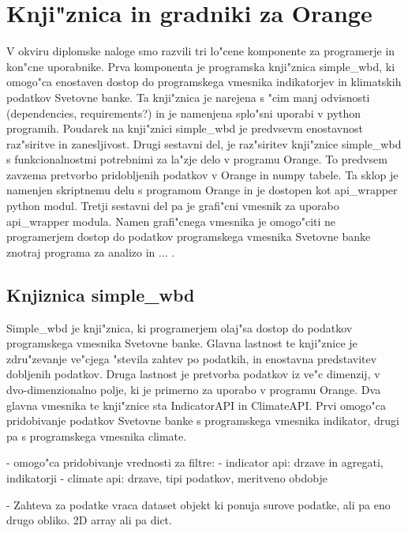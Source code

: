 \chapter{Knji"znica in gradniki za Orange}

V okviru diplomske naloge smo razvili tri lo"cene komponente za programerje in
kon"cne uporabnike. Prva komponenta je programska knji"znica simple\_wbd, ki
omogo"ca enostaven dostop do programskega vmesnika indikatorjev in klimatskih
podatkov Svetovne banke. Ta knji"znica je narejena s "cim manj odvisnosti
(dependencies, requirements?) in je namenjena splo"sni uporabi v python
programih. Poudarek na knji"znici simple\_wbd je predvsevm enostavnost 
raz"siritve in zanesljivost. Drugi sestavni del, je raz"siritev knji"znice
simple\_wbd s funkcionalnostmi potrebnimi za la"zje delo v programu Orange.
To predvsem zavzema pretvorbo pridobljenih podatkov v Orange in numpy tabele.
Ta sklop je namenjen skriptnemu delu s programom Orange in je dostopen kot
api\_wrapper python modul. Tretji sestavni del pa je grafi"cni vmesnik za
uporabo api\_wrapper modula. Namen grafi"cnega vmesnika je omogo"citi ne
programerjem dostop do podatkov programskega vmesnika Svetovne banke znotraj
programa za analizo in ... .

\section{Knjiznica simple\_wbd}

Simple\_wbd je knji"znica, ki programerjem olaj"sa dostop do podatkov
programskega vmesnika Svetovne banke. Glavna lastnost te knji"znice je
zdru"zevanje ve"cjega "stevila zahtev po podatkih, in enostavna predstavitev
dobljenih podatkov. Druga lastnost je pretvorba podatkov iz ve"c dimenzij, v
dvo-dimenzionalno polje, ki je primerno za uporabo v programu Orange. Dva
glavna vmesnika te knji"znice sta IndicatorAPI in ClimateAPI. Prvi omogo"ca
pridobivanje podatkov Svetovne banke s programskega vmesnika indikator, drugi
pa s programskega vmesnika climate.




% 

- omogo"ca pridobivanje vrednosti za filtre:
    - indicator api: drzave in agregati, indikatorji
    - climate api: drzave, tipi podatkov, meritveno obdobje 

- Zahteva za podatke vraca dataset objekt ki ponuja surove podatke, ali pa eno
  drugo obliko. 2D array ali pa dict.

